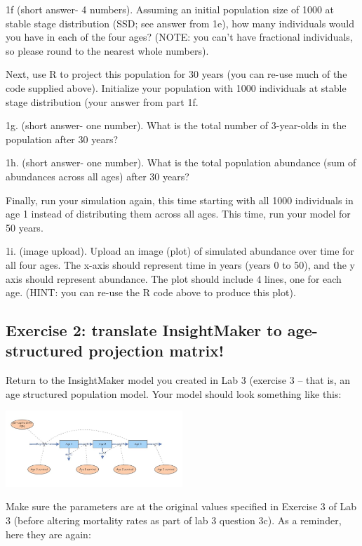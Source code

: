 \documentclass[
]{article}
\begin{document}
1f (short answer- 4 numbers). Assuming an initial population size of
1000 at stable stage distribution (SSD; see answer from 1e), how many
individuals would you have in each of the four ages? (NOTE: you can't
have fractional individuals, so please round to the nearest whole
numbers).

Next, use R to project this population for 30 years (you can re-use much
of the code supplied above). Initialize your population with 1000
individuals at stable stage distribution (your answer from part 1f.

1g. (short answer- one number). What is the total number of 3-year-olds
in the population after 30 years?

1h. (short answer- one number). What is the total population abundance
(sum of abundances across all ages) after 30 years?

Finally, run your simulation again, this time starting with all 1000
individuals in age 1 instead of distributing them across all ages. This
time, run your model for 50 years.

1i. (image upload). Upload an image (plot) of simulated abundance over
time for all four ages. The x-axis should represent time in years (years
0 to 50), and the y axis should represent abundance. The plot should
include 4 lines, one for each age. (HINT: you can re-use the R code
above to produce this plot).

\hypertarget{exercise-2-translate-insightmaker-to-age-structured-projection-matrix}{%
\subsection{Exercise 2: translate InsightMaker to age-structured
projection
matrix!}\label{exercise-2-translate-insightmaker-to-age-structured-projection-matrix}}

Return to the InsightMaker model you created in Lab 3 (exercise 3 --
that is, an age structured population model. Your model should look
something like this:

\includegraphics[width=0.5\textwidth,height=\textheight]{IM7.jpg}

Make sure the parameters are at the original values specified in
Exercise 3 of Lab 3 (before altering mortality rates as part of lab 3
question 3c). As a reminder, here they are again:
\end{document}
